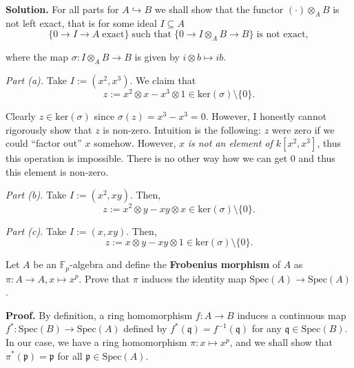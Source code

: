 \documentclass{template}
\begin{document}
\textbf{Solution.} For all parts for $A \hookrightarrow B$ we shall show that the
functor $(\cdot) \otimes_A B$ is not left exact, that is for some ideal $I \subseteq A$
\begin{equation*}
    \{ 0 \to I \to A \; \text{exact} \} \; \text{such that} \; \{0 \to I \otimes_A B \to B\} \; \text{is not exact},
\end{equation*}

where the map $\sigma: I \otimes_A B \to B$ is given by $i \otimes b \mapsto ib$.

\textit{Part (a).} Take $I := (x^2,x^3)$. We claim that
\begin{equation*}
    z := x^2 \otimes x - x^3 \otimes 1 \in \text{ker}(\sigma) \setminus \{0\}.
\end{equation*}

Clearly $z \in \text{ker}(\sigma)$ since $\sigma(z) = x^3 - x^3 = 0$. However, I
honestly cannot rigorously show that $z$ is non-zero. Intuition is the
following: $z$ were zero if we could ``factor out'' $x$ somehow. However, $x$
\textit{is not an element of $k[x^2,x^3]$}, thus this operation is impossible.
There is no other way how we can get $0$ and thus this element is non-zero.

\textit{Part (b).} Take $I := (x^2,xy)$. Then, 
\begin{equation*}
    z := x^2 \otimes y - xy \otimes x \in \text{ker}(\sigma) \setminus \{0\}.
\end{equation*}

\textit{Part (c).} Take $I := (x,xy)$. Then, 
\begin{equation*}
    z := x \otimes y - xy \otimes 1 \in \text{ker}(\sigma) \setminus \{0\}.
\end{equation*}

\begin{problem}[Exercise 3]
    Let $A$ be an $\mathbb{F}_p$-algebra and define the \textbf{Frobenius
    morphism} of $A$ as $\pi: A \to A, x \mapsto x^p$. Prove that $\pi$ induces
    the identity map $\text{Spec}(A) \to \text{Spec}(A)$.
\end{problem}

\textbf{Proof.} By definition, a ring homomorphism $f: A \to B$ induces a
continuous map $f^*: \text{Spec}(B) \to \text{Spec}(A)$ defined by
$f^*(\mathfrak{q}) = f^{-1}(\mathfrak{q})$ for any $\mathfrak{q} \in
\text{Spec}(B)$. In our case, we have a ring homomorphism $\pi: x \mapsto x^p$,
and we shall show that $\pi^*(\mathfrak{p}) = \mathfrak{p}$ for all
$\mathfrak{p} \in \text{Spec}(A)$.
\end{document}
